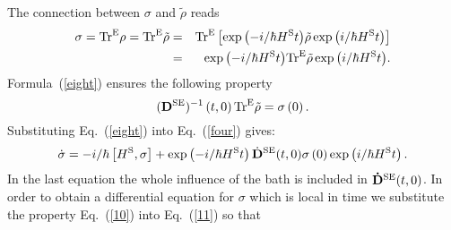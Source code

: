\documentclass[12pt,twoside,a4paper]{report}
\begin{document}
The connection between $\sigma$ and $\tilde \rho$ reads
\begin{eqnarray} 
\sigma 
           =
                {\rm Tr}^{\rm E}\rho  
           =
                {\rm Tr}^{\rm E}\tilde{\rho} 
          &=&
                {\rm Tr}^{\rm E} 
                  \left[  
                       \exp{\left( -i/\hbar H^{\rm S}t\right)}  
                       \tilde{\rho}   
                      \exp{\left( i/\hbar H^{\rm S}t\right)}  
                   \right]  
\nonumber \\ 
          &=&  
               \exp{\left( -i/\hbar H^{\rm S}t\right)} 
                        {\rm Tr}^{\rm E} \tilde{\rho} 
               \exp{\left( i/\hbar H^{\rm S}t\right)} .  \label{9} 
\end{eqnarray} 
Formula~(\ref{eight}) ensures the following property  
\begin{equation} 
        ({\bf D}
               ^{\rm SE})
               ^{-1}
               \left( 
                    t,0
               \right) 
{\rm Tr}^{\rm E}
{\tilde{\rho}}
                             =
                                 \sigma 
                                    \left( 
                                         0
                                    \right) .  \label{10} 
\end{equation} 
Substituting Eq.~(\ref{eight}) into Eq.~(\ref{four}) gives: 
\begin{equation} 
\dot
{\sigma}
           =
              -  i/\hbar 
                 \left[
                     H^{\rm S},\sigma 
                 \right] 
             +   \exp\left(
                          -i/\hbar H^{\rm S}t
                     \right) 
                \dot{\bf D}
                             ^{\rm SE}
                             {\left( t,0\right) }
                \sigma \left( 0\right) 
                \exp \left(
                              i/\hbar H^{\rm S}t
                     \right).  
                                                         \label{11} 
\end{equation} 
In the last equation the whole influence of the bath is included in
$\mathbf{\dot{D}}
                             ^{\rm SE}
                             {\left( t,0\right) }$.
In order to obtain a differential equation
for $\sigma$
which is local in time 
we substitute the  property Eq.~(\ref{10}) into Eq.~(\ref{11}) so that
\end{document}

